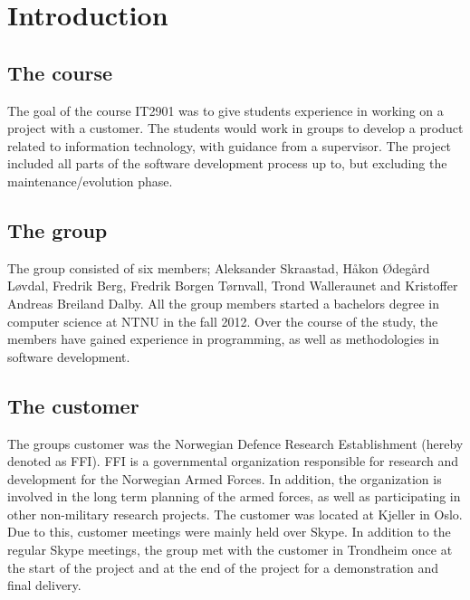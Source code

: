 
\chapter{Introduction}
\label{ch:introduction}

\section{The course}
\label{sec:introduction-the_course}

The goal of the course IT2901 was to give students experience in working on a project with a customer. The students would work in groups to develop a product related to information technology, with guidance from a supervisor. The project included all parts of the software development process up to, but excluding the maintenance/evolution phase.

\section{The group}
\label{sec:introduction-the_group}

The group consisted of six members; Aleksander Skraastad, Håkon Ødegård Løvdal, Fredrik Berg, Fredrik Borgen Tørnvall, Trond Walleraunet and Kristoffer Andreas Breiland Dalby. All the group members started a bachelors degree in computer science at NTNU in the fall 2012. Over the course of the study, the members have gained experience in programming, as well as methodologies in software development.

\section{The customer}
\label{sec:introduction-the_customer}

The groups customer was the Norwegian Defence Research Establishment (hereby denoted as FFI). FFI is a governmental organization responsible for research and development for the Norwegian Armed Forces. In addition, the organization is involved in the long term planning of the armed forces, as well as participating in other non-military research projects. The customer was located at Kjeller in Oslo. Due to this, customer meetings were mainly held over Skype. In addition to the regular Skype meetings, the group met with the customer in Trondheim once at the start of the project and at the end of the project for a demonstration and final delivery.

